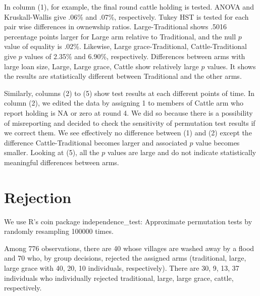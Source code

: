 In column (1), for example, the final round cattle holding is tested. ANOVA and Kruskall-Wallis give .06\% and .07\%, respectively. Tukey HST is tested for each pair wise differences in ownewship ratios. \textsf{Large-Traditional} shows .5016 percentage points larger for \textsf{Large} arm relative to \textsf{Traditional}, and the null $p$ value of equality is .02\%. Likewise, \textsf{Large grace-Traditional, Cattle-Traditional} give $p$ values of 2.35\% and 6.90\%, respectively. Differences between arms with large loan size, \textsf{Large, Large grace, Cattle} show relatively large $p$ values. It shows the results are statistically different between \textsf{Traditional} and the other arms. 

Similarly, columns (2) to (5) show test results at each different points of time. In column (2), we edited the data by assigning 1 to members of \textsf{Cattle} arm who report holding is NA or zero at round 4. We did so because there is a possibility of misreporting and decided to check the sensitivity of permutation test results if we correct them. We see effectively no difference between (1) and (2) except the difference \textsf{Cattle-Traditional} becomes larger and associated $p$ value becomes smaller. Looking at (5), all the $p$ values are large and do not indicate statistically meaningful differences between arms.


\section{Rejection}
\label{AppSecRejection}
\setcounter{table}{0}



We use \textsf{R}'s \textsf{coin} package \textsf{independence\_test}: Approximate permutation tests by randomly resampling 100000 times.

Among 776 observations, there are 40 whose villages are washed away by a flood and 70 who, by group decisions, rejected the assigned arms (traditional, large, large grace with 40, 20, 10 individuals, respectively). There are 30, 9, 13, 37 individuals who individually rejected traditional, large, large grace, cattle, respectively. %







